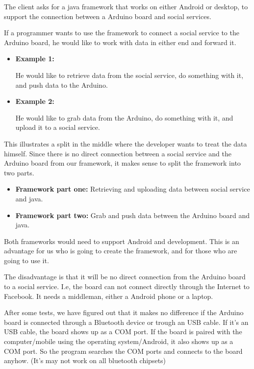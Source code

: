 
The client asks for a java framework that works on either Android or desktop, to support the connection between a Arduino board and social services.

If a programmer wants to use the framework to connect a social service to the Arduino board, he would like to work with data in either end and forward it.

\begin{itemize}
  \item\textbf{Example 1:} 

  He would like to retrieve data from the social service, do something with it, and push data to the Arduino.

  \item\textbf{Example 2:}

  He would like to grab data from the Arduino, do something with it, and upload it to a social service.
\end{itemize}

This illustrates a split in the middle where the developer wants to treat the data himself. Since there is no direct connection between a social service and the Arduino board from our framework, it makes sense to split the framework into two parts.

\begin{itemize}
  \item\textbf{Framework part one:} Retrieving and uploading data between social service and java.
  \item\textbf{Framework part two:} Grab and push data between the Arduino board and java.
\end{itemize}

Both frameworks would need to support Android and development. This is an advantage for us who is going to create the framework, and for those who are going to use it.

The disadvantage is that it will be no direct connection from the Arduino board to a social service.
I.e, the board can not connect directly through the Internet to Facebook. It needs a middleman, either a Android phone or a laptop.

After some tests, we have figured out that it makes no difference if the Arduino board is connected through a Bluetooth device or trough an USB cable. If it's an USB cable, the board shows up as a COM port. If the board is paired with the computer/mobile using the operating system/Android, it also shows up as a COM port. So the program searches the COM ports and connects to the board anyhow. (It's may not work on all bluetooth chipsets)


